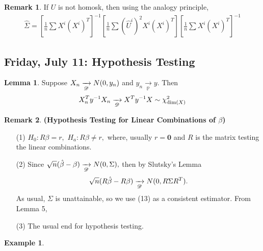\documentclass[10pt, oneside]{article}
\newcommand{\bbP}{\mathbb{P}}
\theoremstyle{definition}
\newtheorem{exmp}{Example}[section]
\newtheorem{rem}{Remark}
\newtheorem{lem}{Lemma}
\begin{document}
\begin{rem}
    If  $U$ is not homosk, then using the analogy principle, 
    \begin{align}
\hat \Sigma = \left[\frac{1}{n}\sum X^i (X^i)^T\right]^{-1} \left[\frac{1}{n} \sum  (\hat U^i) ^2 X^i(X^i)^T\right]\left[\frac{1}{n}\sum X^i (X^i)^T\right]^{-1}        
    \end{align}

\end{rem}

\newpage
\subsection{Friday, July 11: Hypothesis Testing}

\begin{lem}
    Suppose $X_n \xrightarrow[\cal D]{}N(0, y_n)$ and $y_n \xrightarrow[\bbP]{}y.$ Then 
    \[X_n ^Ty^{-1}X_n \xrightarrow[\cal D]{}X^Ty^{-1}X \sim \chi_{\dim (X)}^2\]
\end{lem}

\begin{rem}
    \textbf{(Hypothesis Testing for Linear Combinations of $\beta$)}
    \begin{enumerate}
        \item[(1)] $H_0: R\beta = r,$ $H_a: R\beta \neq r,$ where, usually $r = \textbf{0}$ and $R$ is the matrix testing the linear combinations. 
        \item[(2)] Since $\sqrt{n}(\hat\beta - \beta) \xrightarrow[\cal D]{} N(0, \Sigma),$ then by Slutsky's Lemma
        \[\sqrt{n}(R \hat\beta - R\beta)\xrightarrow[\cal D]{}N(0, R\Sigma R^T).\] As usual, $\Sigma$ is unattainable, so we use (13) as a consistent estimator. From Lemma 5,
        \begin{center}
\end{center}
\item [(3)] The usual end for hypothesis testing.
    \end{enumerate}
\end{rem}

\begin{exmp}
    
\end{exmp}
\end{document}
